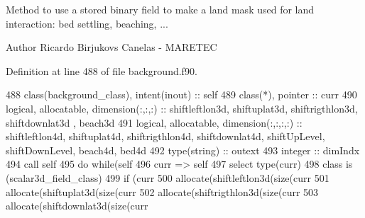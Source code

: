 Method to use a stored binary field to make a land mask used for land interaction\+: bed settling, beaching, ... 

\begin{DoxyAuthor}{Author}
Ricardo Birjukovs Canelas -\/ M\+A\+R\+E\+T\+EC 
\end{DoxyAuthor}


Definition at line 488 of file background.\+f90.


\begin{DoxyCode}
488     \textcolor{keywordtype}{class}(background\_class), \textcolor{keywordtype}{intent(inout)} :: self
489     \textcolor{keywordtype}{class}(*), \textcolor{keywordtype}{pointer} :: curr
490     \textcolor{keywordtype}{logical}, \textcolor{keywordtype}{allocatable}, \textcolor{keywordtype}{dimension(:,:,:)} :: shiftleftlon3d, shiftuplat3d, shiftrigthlon3d, shiftdownlat3d
      , beach3d
491     \textcolor{keywordtype}{logical}, \textcolor{keywordtype}{allocatable}, \textcolor{keywordtype}{dimension(:,:,:,:)} :: shiftleftlon4d, shiftuplat4d, shiftrigthlon4d, 
      shiftdownlat4d, shiftUpLevel, shiftDownLevel, beach4d, bed4d
492     \textcolor{keywordtype}{type}(string) :: outext
493     \textcolor{keywordtype}{integer} :: dimIndx
494     \textcolor{keyword}{call }self%
495     \textcolor{keywordflow}{do} \textcolor{keywordflow}{while}(self%
496         curr => self%
497             \textcolor{keywordflow}{select type}(curr)            
498 \textcolor{keywordflow}{            class is} (scalar3d\_field\_class)
499                 \textcolor{keywordflow}{if} (curr%
500                     \textcolor{keyword}{allocate}(shiftleftlon3d(\textcolor{keyword}{size}(curr%
501                     \textcolor{keyword}{allocate}(shiftuplat3d(\textcolor{keyword}{size}(curr%
502                     \textcolor{keyword}{allocate}(shiftrigthlon3d(\textcolor{keyword}{size}(curr%
503                     \textcolor{keyword}{allocate}(shiftdownlat3d(\textcolor{keyword}{size}(curr%

\end{DoxyCode}
